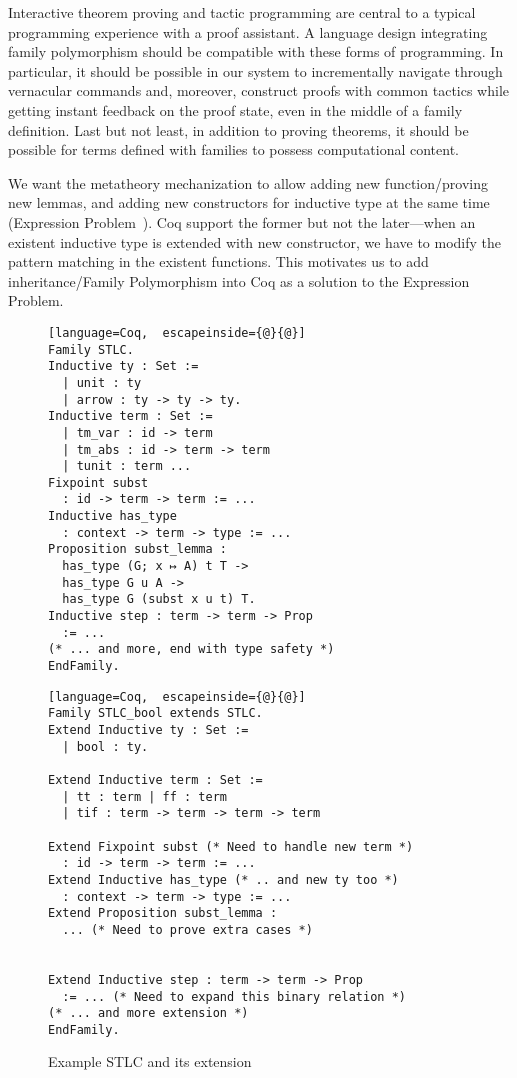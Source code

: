 
Interactive theorem proving and tactic programming are central to
a typical programming experience with a proof assistant.
A language design integrating family polymorphism should be compatible
with these forms of programming.
In particular, it should be possible in our system to
incrementally navigate through vernacular commands and, moreover, construct proofs
with common tactics while getting instant feedback on the proof state,
even in the middle of a family definition.
Last but not least, in addition to proving theorems,
it should be possible for terms defined with families to possess computational content.

\ifShowOldWriting

\newpage

We want the metatheory mechanization to allow adding new
function/proving new lemmas, and adding new constructors for inductive
type at the same time  (Expression Problem~\cite{wadler-ep}). Coq
support the former but not the later---when an existent inductive type
is extended with new constructor, we have to modify the pattern matching
in the existent functions. This motivates us to add inheritance/Family
Polymorphism into Coq as a solution to the Expression Problem. 

\begin{figure}[!htb]
  \begin{minipage}[t]{0.47\linewidth}
\begin{lstlisting}[language=Coq,  escapeinside={@}{@}]
Family STLC.
Inductive ty : Set :=
  | unit : ty
  | arrow : ty -> ty -> ty.
Inductive term : Set := 
  | tm_var : id -> term 
  | tm_abs : id -> term -> term 
  | tunit : term ...
Fixpoint subst 
  : id -> term -> term := ...
Inductive has_type 
  : context -> term -> type := ...
Proposition subst_lemma :
  has_type (G; x ↦ A) t T ->
  has_type G u A ->
  has_type G (subst x u t) T.
Inductive step : term -> term -> Prop 
  := ...
(* ... and more, end with type safety *)
EndFamily.
\end{lstlisting}
  \end{minipage}
  \begin{minipage}[t]{0.47\linewidth}
\begin{lstlisting}[language=Coq,  escapeinside={@}{@}]
Family STLC_bool extends STLC.
Extend Inductive ty : Set :=
  | bool : ty.

Extend Inductive term : Set := 
  | tt : term | ff : term 
  | tif : term -> term -> term -> term

Extend Fixpoint subst (* Need to handle new term *)
  : id -> term -> term := ...
Extend Inductive has_type (* .. and new ty too *)
  : context -> term -> type := ...
Extend Proposition subst_lemma :
  ... (* Need to prove extra cases *)


Extend Inductive step : term -> term -> Prop 
  := ... (* Need to expand this binary relation *)
(* ... and more extension *)
EndFamily.
\end{lstlisting}
  \end{minipage}
  \caption{Example STLC and its extension}\label{fig:STLC-example}
\end{figure}

